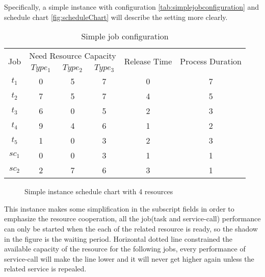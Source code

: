 Specifically, a simple instance with configuration \autoref{tab:simplejobconfiguration} and schedule chart \autoref{fig:scheduleChart} will describe the setting more clearly.
\begin{table}[htbp]
  \centering
  \scriptsize
  \caption{Simple job configuration}
    \begin{tabular}{cccccc}
    \toprule
    \multicolumn{1}{c}{\multirow{2}[0]{*}{ Job}} & \multicolumn{3}{c}{Need Resource Capacity} & \multicolumn{1}{c}{\multirow{2}[0]{*}{Release Time}} & \multicolumn{1}{c}{\multirow{2}[0]{*}{Process Duration}} \\
    \multicolumn{1}{c}{} & $Type_1$ & $Type_2$ & $Type_3$ & \multicolumn{1}{c}{} & \multicolumn{1}{c}{} \\
    \midrule
    $t_1$ & 0     & 5     & 7     & 0     & 7 \\
    $t_2$ & 7     & 5     & 7     & 4     & 5 \\
    $t_3$ & 6     & 0     & 5     & 2     & 3 \\
    $t_4$ & 9	 & 4  & 6 & 1 &2 \\
    $t_5$ & 1 & 0 & 3 & 2 & 3\\
    $sc_1$ & 0     & 0     & 3    & 1     & 1 \\
    $sc_2$ & 2     & 7     & 6     & 3     & 1 \\
    \bottomrule
    \end{tabular}%
  \label{tab:simplejobconfiguration}%
\end{table}%
\begin{figure}[htbp]
	\centering
	\resizebox{.8\textwidth}{!}{}
	\caption{Simple instance schedule chart with 4 resources}
	\label{fig:scheduleChart}
\end{figure}
This instance makes some simplification in the subscript fields in order to emphasize the resource cooperation, all the job(task and service-call) performance can only be started when the each of the related resource is ready, so the shadow in the figure is the waiting period. Horizontal dotted line constrained the available capacity of the resource for the following jobs, every performance of service-call will make the line lower and it will never get higher again unless the related service is repealed.

